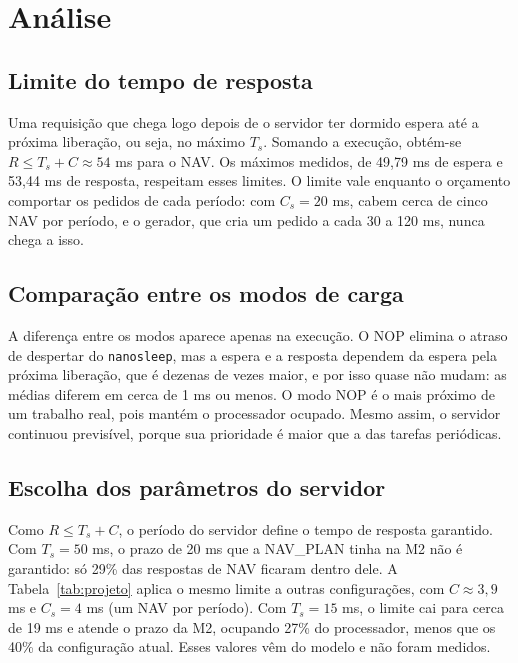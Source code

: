 \documentclass[conference,a4paper]{IEEEtran}
\begin{document}
\section{Análise}

\subsection{Limite do tempo de resposta}
Uma requisição que chega logo depois de o servidor ter dormido espera até a próxima liberação, ou seja, no máximo $T_s$. Somando a execução, obtém-se $R\le T_s+C\approx 54$ ms para o NAV. Os máximos medidos, de 49,79 ms de espera e 53,44 ms de resposta, respeitam esses limites. O limite vale enquanto o orçamento comportar os pedidos de cada período: com $C_s=20$ ms, cabem cerca de cinco NAV por período, e o gerador, que cria um pedido a cada 30 a 120 ms, nunca chega a isso.

\subsection{Comparação entre os modos de carga}
A diferença entre os modos aparece apenas na execução. O NOP elimina o atraso de despertar do \texttt{nanosleep}, mas a espera e a resposta dependem da espera pela próxima liberação, que é dezenas de vezes maior, e por isso quase não mudam: as médias diferem em cerca de 1 ms ou menos. O modo NOP é o mais próximo de um trabalho real, pois mantém o processador ocupado. Mesmo assim, o servidor continuou previsível, porque sua prioridade é maior que a das tarefas periódicas.

\newpage %
\subsection{Escolha dos parâmetros do servidor}
Como $R\le T_s+C$, o período do servidor define o tempo de resposta garantido. Com $T_s=50$ ms, o prazo de 20 ms que a NAV\_PLAN tinha na M2 não é garantido: só 29\% das respostas de NAV ficaram dentro dele. A Tabela~\ref{tab:projeto} aplica o mesmo limite a outras configurações, com $C\approx 3,9$ ms e $C_s=4$ ms (um NAV por período). Com $T_s=15$ ms, o limite cai para cerca de 19 ms e atende o prazo da M2, ocupando 27\% do processador, menos que os 40\% da configuração atual. Esses valores vêm do modelo e não foram medidos.
\end{document}
